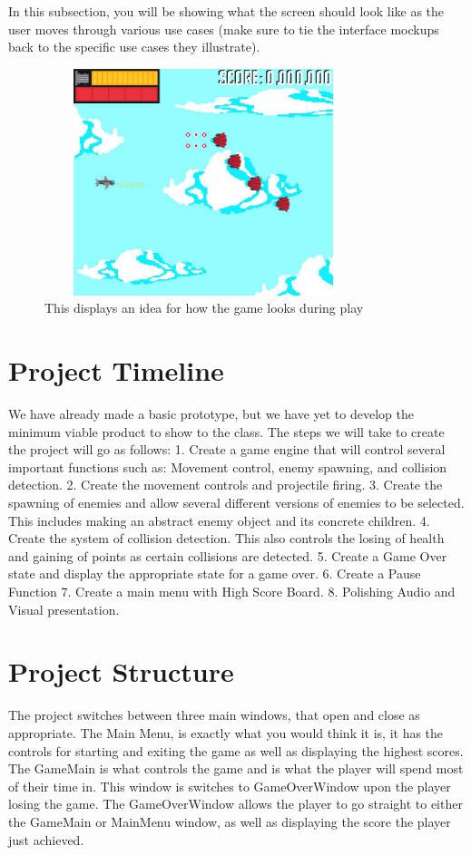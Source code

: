 \documentclass[10pt,conference,onecolumn,compsoc]{IEEEtran}
\begin{document}
In this subsection, you will be showing what the screen should look like as the user moves through various use cases (make sure to tie the interface mockups back to the specific use cases they illustrate).

\begin{figure}[ht!]
\includegraphics[height=250px, width=350px]{Spitfire_91MockUp.jpg}
\caption{This displays an idea for how the game looks during play}
\label{cat1}
\end{figure}


\section{Project Timeline}
We have already made a basic prototype, but we have yet to develop the minimum viable product to show to the class. The steps we will take to create the project will go as follows: 
1. Create a game engine that will control several important functions such as: Movement control, enemy spawning, and collision detection.
2. Create the movement controls and projectile firing. 
3. Create the spawning of enemies and allow several different versions of enemies to be selected. This includes making an abstract enemy object and its concrete children.
4. Create the system of collision detection. This also controls the losing of health and gaining of points as certain collisions are detected. 
5. Create a Game Over state and display the appropriate state for a game over.
6. Create a Pause Function 
7. Create a main menu with High Score Board.
8. Polishing Audio and Visual presentation.

\section{Project Structure}
The project switches between three main windows, that open and close as appropriate. The Main Menu, is exactly what you would think it is, it has the controls for starting and exiting the game as well as displaying the highest scores. The GameMain is what controls the game and is what the player will spend most of their time in. This window is switches to GameOverWindow upon the player losing the game. The GameOverWindow allows the player to go straight to either the GameMain or MainMenu window, as well as displaying the score the player just achieved.
\end{document}
